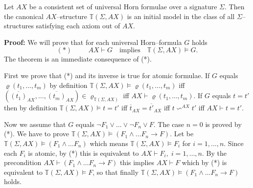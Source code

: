 \documentclass[landscape, autoslides, light]{mmiss}
\newcommand{\ns}{\normalsize}
\begin{document}
\begin{Package}[Label={FSDPT}, Title={Formal Specification of Data and Process Types}, ShortTitle={FSDPT}, Authors={Horst Reichel}, Date={February 2003}, LevelOfDetail=Lecture, Language=en-GB]
\begin{Section}[Title={Initial Algebras as Data Types}, Label={section3}]
\begin{Section}[Title={Existence of initial models}, Label={section3_1}]
\begin{Paragraph}[Title={Universal Horn--formulae}, Label=Paragraph39]
\end{Paragraph}
\begin{Paragraph}[Title={Existence of Initial Models}, Label=Paragraph40]
\ns
\begin{Theorem}[Title = {Initial Algebras as Data Types}, Label = {Theorem3}] Let $AX$ be
a consistent set of universal Horn formulae over a signature
$\Sigma$. Then the canonical $AX$--structure $
\mathbb{T}(\Sigma,AX)$ is an initial model in the class of all
$\Sigma$--structures satisfying each axiom out of $AX$.
\end{Theorem}


\end{Paragraph}
\begin{Paragraph}[Label=Paragraph41]

\small \small \textbf{Proof:}  We will prove that for each
universal Horn--formula $G$ holds
$$(*) \hspace{1cm} AX \vdash G \quad \mbox{implies} \quad
\mathbb{T}(\Sigma,AX) \vDash G.$$ The theorem is an immediate
consequence of (*).

First we prove that (*) and its inverse is true for atomic
formulae. If $G$ equals $\varrho (t_1, \ldots , t_m)$ by
definition $\mathbb{T}(\Sigma,AX) \vDash \varrho (t_1, \ldots ,
t_m)$ iff $(\overline{(t_1)}_{AX} , \ldots ,
\overline{(t_m)}_{AX}) \in \varrho_{\mathbb{T}(\Sigma,AX)}$ iff
$AX \vdash \varrho (t_1, \ldots , t_m)$. If $G$ equals $t = t'$
then by definition $\mathbb{T}(\Sigma,AX) \vDash t = t'$ iff
$\overline{t}_{AX} = \overline{t'}_{AX}$ iff $t \backsim^{AX} t'$
iff $AX \vdash t = t'$.

Now we assume that $G$ equals $\neg F_1 \vee \ldots \vee \neg F_n
\vee F$. The case $n = 0$ is proved by (*). We have to prove
$\mathbb{T}(\Sigma,AX) \vDash (F_1 \wedge \ldots F_n \to F)$. Let
be $\mathbb{T}(\Sigma,AX) \vDash (F_1 \wedge \ldots F_n )$ which
means $\mathbb{T}(\Sigma,AX) \vDash F_i$ for $i = 1, \ldots , n$.
Since each $F_i$ is atomic, by (*) this is equivalent to $AX
\vdash F_i, \; i = 1, \ldots , n$. By the precondition $AX \vdash
(F_1 \wedge \ldots F_n \to F)$ this implies $AX \vdash F$ which by
(*) is equivalent to $\mathbb{T}(\Sigma,AX) \vDash F$, so that
finally $\mathbb{T}(\Sigma,AX) \vDash (F_1 \wedge \ldots F_n \to
F)$ holds.


\end{Paragraph}
\end{Section}
\end{Section}
\end{Package}
\end{document}
